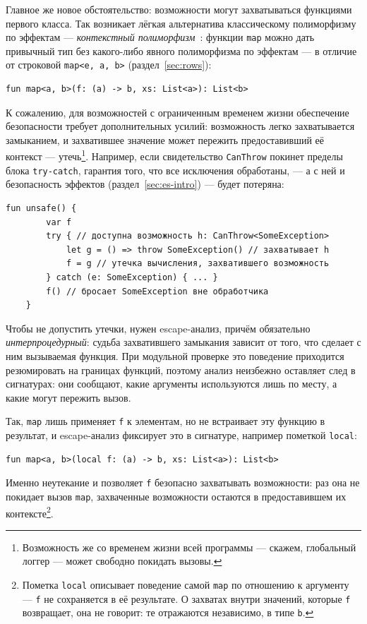 \documentclass{ProcISPRAS}
\begin{document}
Главное же новое обстоятельство: возможности могут захватываться функциями первого
класса. Так возникает лёгкая альтернатива классическому полиморфизму по эффектам ---
\emph{контекстный полиморфизм}~\cite{brachthauser2020effects, brachthauser2022effects}:
функции \texttt{map} можно дать привычный
тип без какого-либо явного полиморфизма по эффектам --- в отличие от строковой
\texttt{map<e, a, b>} (раздел~\ref{sec:rows}):
\begin{lstlisting}[language=colang]
    fun map<a, b>(f: (a) -> b, xs: List<a>): List<b>
\end{lstlisting}

К сожалению, для возможностей с ограниченным временем жизни обеспечение безопасности
требует дополнительных усилий: возможность легко захватывается замыканием, и захватившее
значение может пережить предоставивший её контекст --- утечь\footnote{Возможность же со
временем жизни всей программы --- скажем, глобальный логгер --- может свободно покидать
вызовы.}.
Например, если свидетельство \lstinline|CanThrow| покинет пределы блока
\lstinline|try-catch|, гарантия того, что все исключения обработаны, --- а с ней и
безопасность эффектов (раздел~\ref{sec:es-intro}) --- будет потеряна:
\begin{lstlisting}[language=colang]
    fun unsafe() {
        var f
        try { // доступна возможность h: CanThrow<SomeException>
            let g = () => throw SomeException() // захватывает h
            f = g // утечка вычисления, захватившего возможность
        } catch (e: SomeException) { ... }
        f() // бросает SomeException вне обработчика
    }
\end{lstlisting}
Чтобы не допустить утечки, нужен escape-анализ, причём обязательно
\emph{интерпроцедурный}: судьба захватившего замыкания зависит от того, что сделает с
ним вызываемая функция. При модульной проверке это поведение приходится резюмировать на
границах функций, поэтому анализ неизбежно оставляет след в сигнатурах: они сообщают,
какие аргументы используются лишь по месту, а какие могут пережить вызов.

Так, \texttt{map} лишь применяет \lstinline|f| к
элементам, но не встраивает эту функцию в результат, и escape-анализ фиксирует это
в сигнатуре, например пометкой \lstinline|local|:
\begin{lstlisting}[language=colang]
    fun map<a, b>(local f: (a) -> b, xs: List<a>): List<b>
\end{lstlisting}
Именно неутекание и позволяет \lstinline|f| безопасно захватывать возможности: раз она
не покидает вызов \texttt{map}, захваченные возможности остаются в предоставившем их
контексте\footnote{Пометка \lstinline|local| описывает поведение самой \texttt{map} по
отношению к аргументу --- \lstinline|f| не сохраняется в её результате. О захватах
внутри значений, которые \lstinline|f| возвращает, она не говорит: те отражаются
независимо, в типе \lstinline|b|.}.
\end{document}
